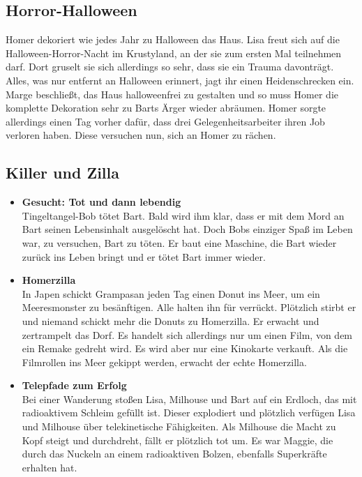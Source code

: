 
\subsection{Horror-Halloween}
Homer dekoriert wie jedes Jahr zu Halloween das Haus. Lisa freut sich auf die Halloween-Horror-Nacht im Krustyland, an der sie zum ersten Mal teilnehmen darf. Dort gruselt sie sich allerdings so sehr, dass sie ein Trauma davonträgt. Alles, was nur entfernt an Halloween erinnert, jagt ihr einen Heidenschrecken ein. Marge beschließt, das Haus halloweenfrei zu gestalten und so muss Homer die komplette Dekoration sehr zu Barts Ärger wieder abräumen. Homer sorgte allerdings einen Tag vorher dafür, dass drei Gelegenheitsarbeiter ihren Job verloren haben. Diese versuchen nun, sich an Homer zu rächen.


\subsection{Killer und Zilla}
\begin{itemize}
	\item \textbf{Gesucht: Tot und dann lebendig}\\ Tingeltangel-Bob tötet Bart. Bald wird ihm klar, dass er mit dem Mord an Bart seinen Lebensinhalt ausgelöscht hat. Doch Bobs einziger Spaß im Leben war, zu versuchen, Bart zu töten. Er baut eine Maschine, die Bart wieder zurück ins Leben bringt und er tötet Bart immer wieder.
	\item \textbf{Homerzilla}\\ In Japen schickt Grampasan jeden Tag einen Donut ins Meer, um ein Meeresmonster zu besänftigen. Alle halten ihn für verrückt. Plötzlich stirbt er und niemand schickt mehr die Donuts zu Homerzilla. Er erwacht und zertrampelt das Dorf. Es handelt sich allerdings nur um einen Film, von dem ein Remake gedreht wird. Es wird aber nur eine Kinokarte verkauft. Als die Filmrollen ins Meer gekippt werden, erwacht der echte Homerzilla.
	\item \textbf{Telepfade zum Erfolg}\\ Bei einer Wanderung stoßen Lisa, Milhouse und Bart auf ein Erdloch, das mit radioaktivem Schleim gefüllt ist. Dieser explodiert und plötzlich verfügen Lisa und Milhouse über telekinetische Fähigkeiten. Als Milhouse die Macht zu Kopf steigt und durchdreht, fällt er plötzlich tot um. Es war Maggie, die durch das Nuckeln an einem radioaktiven Bolzen, ebenfalls Superkräfte erhalten hat.
\end{itemize}

